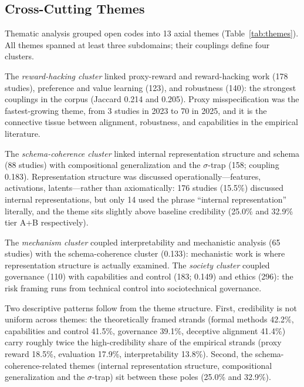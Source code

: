 \subsection{Cross-Cutting Themes}
Thematic analysis grouped open codes into 13 axial themes (Table~\ref{tab:themes}). All themes spanned at least three subdomains; their couplings define four clusters.

The \emph{reward-hacking cluster} linked proxy-reward and reward-hacking work (178 studies), preference and value learning (123), and robustness (140): the strongest couplings in the corpus (Jaccard 0.214 and 0.205). Proxy misspecification was the fastest-growing theme, from 3 studies in 2023 to 70 in 2025, and it is the connective tissue between alignment, robustness, and capabilities in the empirical literature.

The \emph{schema-coherence cluster} linked internal representation structure and schema (88 studies) with compositional generalization and the $\sigma$-trap (158; coupling 0.183). Representation structure was discussed operationally---features, activations, latents---rather than axiomatically: 176 studies (15.5\%) discussed internal representations, but only 14 used the phrase ``internal representation'' literally, and the theme sits slightly above baseline credibility (25.0\% and 32.9\% tier A+B respectively).

The \emph{mechanism cluster} coupled interpretability and mechanistic analysis (65 studies) with the schema-coherence cluster (0.133): mechanistic work is where representation structure is actually examined. The \emph{society cluster} coupled governance (110) with capabilities and control (183; 0.149) and ethics (296): the risk framing runs from technical control into sociotechnical governance.

Two descriptive patterns follow from the theme structure. First, credibility is not uniform across themes: the theoretically framed strands (formal methods 42.2\%, capabilities and control 41.5\%, governance 39.1\%, deceptive alignment 41.4\%) carry roughly twice the high-credibility share of the empirical strands (proxy reward 18.5\%, evaluation 17.9\%, interpretability 13.8\%). Second, the schema-coherence-related themes (internal representation structure, compositional generalization and the $\sigma$-trap) sit between these poles (25.0\% and 32.9\%).

